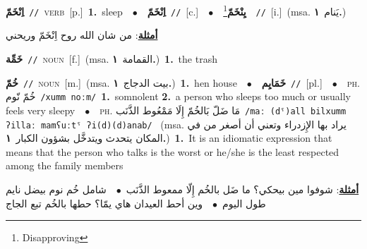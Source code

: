 \documentclass[10pt,a4paper,twoside]{article} %
\begin{document}
\begin{multicols}{2}
{\setlength\topsep{0pt}\textbf{\foreignlanguage{arabic}{اِنْخَمّ}}\ {\color{gray}\texttt{//}\color{black}}\ \textsc{verb}\ [p.]\ \textbf{1.}~sleep\ \ $\bullet$\ \ \setlength\topsep{0pt}\textbf{\foreignlanguage{arabic}{اِنْخَمّ}}\ {\color{gray}\texttt{//}\color{black}}\ [c.]\ \ $\bullet$\ \ \setlength\topsep{0pt}\textbf{\foreignlanguage{arabic}{يِنْخَمّ}}\footnote{Disapproving}\ \ {\color{gray}\texttt{//}\color{black}}\ [i.]\ \color{gray}(msa. \foreignlanguage{arabic}{يَنام}~\foreignlanguage{arabic}{\textbf{١.}})\color{black}\  \begin{flushright}\color{gray}\foreignlanguage{arabic}{\textbf{\underline{\foreignlanguage{arabic}{أمثلة}}}: من شان الله روح اِنْخَمّ وريحني}\end{flushright}\color{black}} \vspace{2mm}

{\setlength\topsep{0pt}\textbf{\foreignlanguage{arabic}{خَمِّة}}\ {\color{gray}\texttt{//}\color{black}}\ \textsc{noun}\ [f.]\ \color{gray}(msa. \foreignlanguage{arabic}{القمامة}~\foreignlanguage{arabic}{\textbf{١.}})\color{black}\ \textbf{1.}~the trash\ } \vspace{2mm}

{\setlength\topsep{0pt}\textbf{\foreignlanguage{arabic}{خُمّ}}\ {\color{gray}\texttt{//}\color{black}}\ \textsc{noun}\ [m.]\ \color{gray}(msa. \foreignlanguage{arabic}{بيت الدجاج}~\foreignlanguage{arabic}{\textbf{١.}})\color{black}\ \textbf{1.}~hen house\ \ $\bullet$\ \ \setlength\topsep{0pt}\textbf{\foreignlanguage{arabic}{خَمَايِم}}\ {\color{gray}\texttt{//}\color{black}}\ [pl.]\ \ $\bullet$\ \ \textsc{ph.} \color{gray} \foreignlanguage{arabic}{خُمّ نّوم}\color{black}\ {\color{gray}\texttt{/{\sffamily xumm noːm}/}\color{black}}\ \textbf{1.}~somnolent  \textbf{2.}~a person who sleeps too much or usually feels very sleepy\ \ $\bullet$\ \ \textsc{ph.} \color{gray} \foreignlanguage{arabic}{مَا ضَلّ بَالخُمّ إِلَا مَمْعُوط الذَّنَب}\color{black}\ {\color{gray}\texttt{/{\sffamily maː (dˤ)all bilxumm ʔillaː mamʕuːtˤ ʔi(d)(d)anab}/}\color{black}}\ \color{gray} (msa. \foreignlanguage{arabic}{يراد بها الإِزدراء وتعني أن أصغر من في المكان يتحدث ويتدخَّل بشؤون الكبار}~\foreignlanguage{arabic}{\textbf{١.}})\color{black}\ \textbf{1.}~It is an idiomatic expression that means that the person who talks is the worst or he/she is the least respected among the family members\  \begin{flushright}\color{gray}\foreignlanguage{arabic}{\textbf{\underline{\foreignlanguage{arabic}{أمثلة}}}: شوفوا مين بيحكي؟ ما ضَل بالخُم إِلّا ممعوط الذَّنَب\ $\bullet$\ \  شامل خُم نوم بيضل نايم طول اليوم\ $\bullet$\ \  وين أحط العيدان هاي يمّا؟ حطها بالخُم تبع الجاج}\end{flushright}\color{black}} \vspace{2mm}


\end{multicols}
\end{document}
